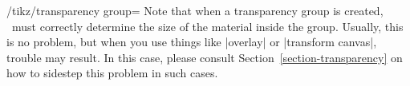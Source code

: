 \begin{key}{/tikz/transparency group=}
  Note that when a transparency group is created, \tikzname\ must
  correctly determine the size of the material inside the
  group. Usually, this is no problem, but when you use things like
  |overlay| or |transform canvas|, trouble may result. In this case,
  please consult Section~\ref{section-transparency} on how to sidestep
  this problem in such cases.
\end{key}





